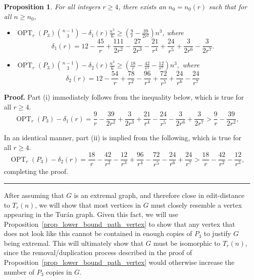 \documentclass[12pt]{article}
\newtheorem{prop}[thm]{Proposition}
\DeclareMathOperator{\OPT}{OPT}
\renewenvironment{proof}[1][Proof]{\textbf{#1.} }{\ \rule{0.5em}{0.5em}}
\begin{document}
\begin{prop}\label{prop:n_0 bounds for the type 2 and 1 claims}
For all integers $r \geq 4$, there exists an $n_0 = n_0(r)$ such that for all $n \geq n_0$, 
\begin{itemize}
\item[(i)] $\OPT_r(P_3)\binom{n-1}{3} - \delta_1(r)\frac{n^3}{6} \geq \left(\frac{9}{r} - \frac{39}{2r^2}\right)n^3$,
where 
\[ \delta_1(r) = 12 - \frac{45}{r} + \frac{111}{2r^2} - \frac{27}{2r^3} - \frac{21}{r^4} + \frac{24}{r^5} + \frac{3}{2r^6} - \frac{3}{2r^7}.\]
\item[(ii)] $\OPT_r(P_3)\binom{n-1}{3} - \delta_2(r)\frac{n^3}{6} \geq \left(\frac{18}{r} - \frac{42}{r^2} - \frac{12}{r^3} \right)n^3,$
where 
\[ \delta_2(r) = 12 - \frac{54}{r} + \frac{78}{r^2} - \frac{96}{r^4}  + \frac{72}{r^5} + \frac{24}{r^6} - \frac{24}{r^7}\]
\end{itemize}
\end{prop}

\begin{proof}
Part (i) immediately follows from the inequality below, which is true for all $r \geq 4$.
\[ 
\OPT_r(P_3) - \delta_1(r) = \frac{9}{r} - \frac{39}{2r^2} + \frac{3}{2r^3} + \frac{21}{r^4} - \frac{24}{r^5}  - \frac{3}{2r^6} + \frac{3}{2r^7} > \frac{9}{r} - \frac{39}{2r^2},
\]

In an identical manner, part (ii) is implied from the following, which is true for all $r \geq 4$.
\[ 
\OPT_r(P_3) - \delta_2(r) = \frac{18}{r} - \frac{42}{r^2} - \frac{12}{r^3} + \frac{96}{r^4} - \frac{72}{r^5}  - \frac{24}{r^6} + \frac{24}{r^7} > \frac{18}{r} - \frac{42}{r^2} - \frac{12}{r^3},
\]
completing the proof.
\end{proof}

After assuming that $G$ is an extremal graph, and therefore close in edit-distance to $T_r(n)$, we will show that most vertices in $G$ must closely resemble a vertex appearing in the Tur\'{a}n graph. Given this fact, we will use Proposition~\ref{prop_lower_bound_path_vertex} to show that any vertex that does not look like this cannot be contained in enough copies of $P_3$ to justify $G$ being extremal. This will ultimately show that $G$ must be isomorphic to $T_r(n)$, since the removal/duplication process described in the proof of Proposition~\ref{prop_lower_bound_path_vertex} would otherwise increase the number of $P_3$ copies in $G$. 
\end{document}
